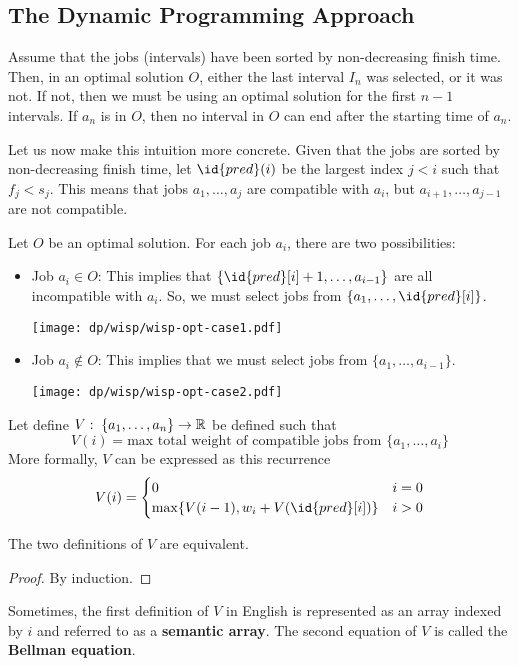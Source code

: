 \subsection{The Dynamic Programming Approach}

Assume that the jobs (intervals) have been sorted by non-decreasing finish time. Then, in an optimal solution $O$, either the last interval $I_n$ was selected, or it was not. If not, then we must be using an optimal solution for the first $n-1$ intervals. If $a_n$ is in $O$, then no interval in $O$ can end after the starting time of $a_n$.

Let us now make this intuition more concrete. Given that the jobs are sorted by non-decreasing finish time, let $\id{pred}(i)$ be the largest index $j < i$ such that $f_j < s_j$. This means that jobs $a_1,\ldots,a_j$ are compatible with $a_i$, but $a_{i+1},\ldots,a_{j-1}$ are not compatible.

Let $O$ be an optimal solution. For each job $a_i$, there are two possibilities:
\begin{itemize}
    \item Job $a_i \in O$: This implies that $\{\id{pred}[i]+1,\ldots,a_{i-1}\}$ are all incompatible with $a_i$. So, we must select jobs from $\{a_1,\ldots,\id{pred}[i]\}$.
    
    \begin{center}
        \texttt{[image: dp/wisp/wisp-opt-case1.pdf]}
    \end{center}

    \item Job $a_i \not\in O$: This implies that we must select jobs from $\{a_1,\ldots,a_{i-1}\}$. 
    
    \begin{center}
        \texttt{[image: dp/wisp/wisp-opt-case2.pdf]}
    \end{center}
\end{itemize}

Let define $V:\; \{a_1,\ldots,a_n\} \to \mathbb{R}$ be defined such that
$$
V(i) = \text{max total weight of compatible jobs from $\{a_1,\ldots,a_i\}$}
$$
More formally, $V$ can be expressed as this recurrence
$$
V(i) = \begin{cases}
    0 & i = 0 \\
    \max \{V(i-1),w_i+V(\id{pred}[i]) \} & i > 0
\end{cases}
$$
\begin{lemma}
    The two definitions of $V$ are equivalent.
\end{lemma}
\begin{proof}
    By induction.
\end{proof}
 
Sometimes, the first definition of $V$ in English is represented as an array indexed by $i$ and referred to as a \textbf{semantic array}. The second equation of $V$ is called the \textbf{Bellman equation}.

